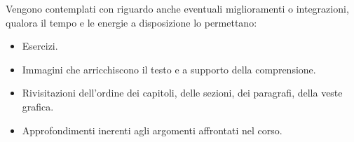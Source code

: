 Vengono contemplati con riguardo anche eventuali miglioramenti o integrazioni,
qualora il tempo e le energie a disposizione lo permettano:

\begin{itemize}
    \item Esercizi.
    \item Immagini che arricchiscono il testo e a supporto della comprensione.
    \item Rivisitazioni dell'ordine dei capitoli, delle sezioni, dei paragrafi, della veste grafica.
    \item Approfondimenti inerenti agli argomenti affrontati nel corso.
\end{itemize}